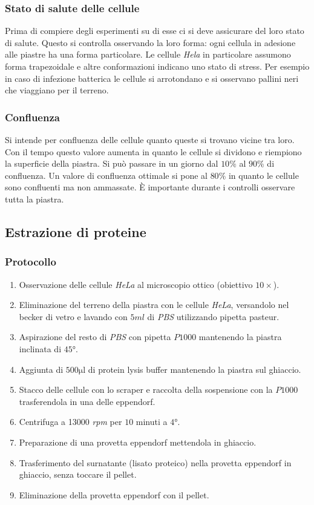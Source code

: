 		\subsubsection{Stato di salute delle cellule}
		Prima di compiere degli esperimenti su di esse ci si deve assicurare del loro stato di salute. 
		Questo si controlla osservando la loro forma: ogni cellula in adesione alle piastre ha una forma particolare.
		Le cellule \emph{Hela} in particolare assumono forma trapezoidale e altre conformazioni indicano uno stato di stress.
		Per esempio in caso di infezione batterica le cellule si arrotondano e si osservano pallini neri che viaggiano per il terreno. 
		
		\subsubsection{Confluenza}
		Si intende per confluenza delle cellule quanto queste si trovano vicine tra loro. 
		Con il tempo questo valore aumenta in quanto le cellule si dividono e riempiono la superficie della piastra.
		Si pu\`o passare in un giorno dal $10\%$ al $90\%$ di confluenza.
		Un valore di confluenza ottimale si pone al $80\%$ in quanto le cellule sono confluenti ma non ammassate.
		\`E importante durante i controlli osservare tutta la piastra.


	\subsection{Estrazione di proteine}

		\subsubsection{Protocollo}
		\begin{enumerate}
			\item Osservazione delle cellule \emph{HeLa} al microscopio ottico (obiettivo $10\times$).
			\item Eliminazione del terreno della piastra con le cellule \emph{HeLa}, versandolo nel becker di vetro e lavando con $5\si{ml}$ di \emph{PBS} utilizzando pipetta pasteur.
			\item Aspirazione del resto di \emph{PBS} con pipetta $P1000$ mantenendo la piastra inclinata di $45\si{\degree}$.
			\item Aggiunta di $500\si{\micro\litre}$ di protein lysis buffer mantenendo la piastra sul ghiaccio.
			\item Stacco delle cellule con lo scraper e raccolta della sospensione con la $P1000$ trasferendola in una delle eppendorf.
			\item Centrifuga a \num{13000} \emph{rpm} per $10$ minuti a $4\si{\degree}$.
			\item Preparazione di una provetta eppendorf mettendola in ghiaccio.
			\item Trasferimento del surnatante (lisato proteico) nella provetta eppendorf in ghiaccio, senza toccare il pellet.
			\item Eliminazione della provetta eppendorf con il pellet.
		\end{enumerate}

